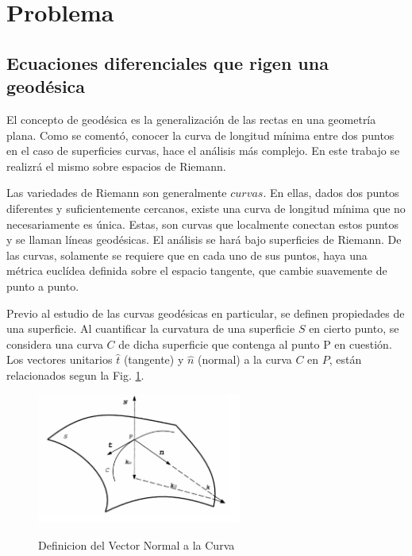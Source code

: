 \documentclass{endm}
\begin{document}
%
\section{Problema}\label{Problema}

\subsection{Ecuaciones diferenciales que rigen una geod\'esica}


\tab El concepto de geod\'esica es la generalizaci\'on de las rectas en una geometr\'ia plana. Como se coment\'o, conocer la curva de longitud m\'inima entre dos puntos en el caso de superficies curvas, hace el an\'alisis m\'as complejo. En este trabajo se realizr\'a el mismo sobre espacios de Riemann.



Las variedades de Riemann son generalmente $curvas$. En ellas, dados dos puntos diferentes y suficientemente cercanos, existe una curva de longitud m\'inima que no necesariamente es \'unica. Estas, son curvas que localmente conectan estos puntos y se llaman l\'ineas geod\'esicas.
El an\'alisis se har\'a bajo superficies de Riemann. De las curvas, solamente se requiere que en cada uno de sus puntos, haya una m\'etrica eucl\'idea definida sobre el espacio tangente, que cambie suavemente de punto a punto.


Previo al estudio de las curvas geod\'esicas en particular, se definen propiedades de una superficie.
Al cuantificar la curvatura de una superficie $S$ en cierto punto, se considera una curva $C$ de dicha superficie que contenga al punto P en cuesti\'on. Los vectores unitarios $\hat{t}$ (tangente) y $\hat{n}$ (normal) a la curva $C$ en $P$, est\'an relacionados segun la Fig. \ref{fig:vectores}.\\

\begin{figure}[H]
\caption{Definicion del Vector Normal a la Curva}
\centering
\includegraphics[width=0.6\textwidth]{Vector_Normal.jpg}
\label{fig:vectores}
\end{figure}
\end{document}
